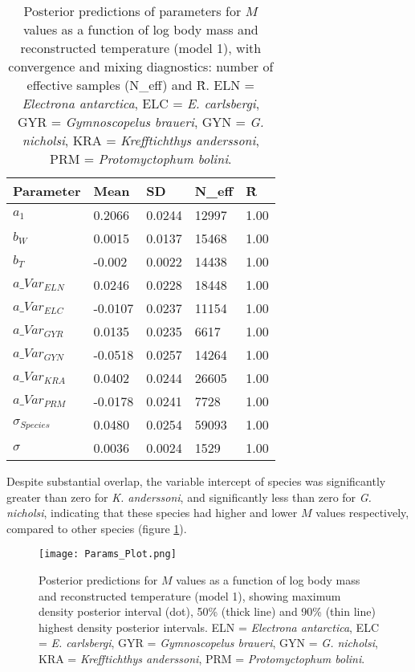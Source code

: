 \documentclass[12pt, titlepage]{article}
\begin{document}
\begin{table}[H]
\begin{center}
\caption{Posterior predictions of parameters for $M$ values as a function of log body mass and reconstructed temperature (model 1), with convergence and mixing diagnostics: number of effective samples (N\_eff) and \^R. ELN = \textit{Electrona antarctica}, ELC = \textit{E. carlsbergi}, GYR = \textit{Gymnoscopelus braueri}, GYN = \textit{G. nicholsi}, KRA = \textit{Krefftichthys anderssoni}, PRM = \textit{Protomyctophum bolini}.}
\label{tab:WT}

\def\arraystretch{1.5}
  \begin{tabular}{ | l | l | l | l | l |}
    \hline
    \textbf{Parameter} & Mean & SD & N\_eff & \^R \\ \hline
    $a_{1}$ & 0.2066 & 0.0244 & 12997 & 1.00 \\ \hline
   $b_{W}$ & 0.0015 & 0.0137 & 15468 & 1.00\\ \hline
    $b_{T}$ & -0.002 & 0.0022 & 14438 & 1.00 \\ \hline
    $a\_Var_{ELN}$ & 0.0246 & 0.0228 & 18448 & 1.00 \\ \hline
    $a\_Var_{ELC}$ & -0.0107 & 0.0237 & 11154 & 1.00 \\ \hline
    $a\_Var_{GYR}$ & 0.0135 & 0.0235 & 6617 & 1.00 \\ \hline
    $a\_Var_{GYN}$ & -0.0518 & 0.0257 & 14264 & 1.00 \\ \hline
    $a\_Var_{KRA}$ & 0.0402 & 0.0244 & 26605 & 1.00 \\ \hline
    $a\_Var_{PRM}$ & -0.0178 & 0.0241 & 7728 & 1.00 \\ \hline
    $\sigma_{Species}$ & 0.0480 & 0.0254 & 59093 & 1.00 \\ \hline
    $\sigma$ & 0.0036 & 0.0024 & 1529 & 1.00 \\
    \hline
  \end{tabular}
  \end{center}
\end{table}

Despite substantial overlap, the variable intercept of species was significantly greater than zero for \textit{K. anderssoni}, and significantly less than zero for \textit{G. nicholsi}, indicating that these species had higher and lower $M$ values respectively, compared to other species (figure \ref{fig:ParamsWT}).

\begin{figure}[H]
\texttt{[image: Params\_Plot.png]}
\caption{Posterior predictions for $M$ values as a function of log body mass and reconstructed temperature (model 1), showing maximum density posterior interval (dot), 50\% (thick line) and 90\% (thin line) highest density posterior intervals. ELN = \textit{Electrona antarctica}, ELC = \textit{E. carlsbergi}, GYR = \textit{Gymnoscopelus braueri}, GYN = \textit{G. nicholsi}, KRA = \textit{Krefftichthys anderssoni}, PRM = \textit{Protomyctophum bolini}.}
\label{fig:ParamsWT}
\end{figure}
\end{document}
